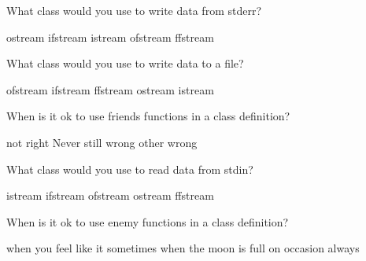 \documentclass[10pt,answers,addpoints]{exam}
\begin{document}
\begin{questions}
\par\vspace{0.100000in}\begin{minipage}{\linewidth}
\question[2]
What class would you use to write data from stderr?
\medskip
\begin{choices}
\choice ostream
\choice ifstream
\choice istream
\choice ofstream
\choice ffstream
\end{choices}
\setlength\answerlinelength{1in}
\answerline[A]

\end{minipage}


\par\vspace{0.100000in}\begin{minipage}{\linewidth}
\question[2]
What class would you use to write data to a file?
\medskip
\begin{choices}
\choice ofstream
\choice ifstream
\choice ffstream
\choice ostream
\choice istream
\end{choices}
\setlength\answerlinelength{1in}
\answerline[A]

\end{minipage}


\par\vspace{0.100000in}\begin{minipage}{\linewidth}
\question[2]
When is it ok to use friends functions in a class definition?
\medskip
\begin{choices}
\choice not right
\choice Never
\choice still wrong
\choice other
\choice wrong
\end{choices}
\setlength\answerlinelength{1in}
\answerline[B]

\end{minipage}


\par\vspace{0.100000in}\begin{minipage}{\linewidth}
\question[2]
What class would you use to read data from stdin?
\medskip
\begin{choices}
\choice istream
\choice ifstream
\choice ofstream
\choice ostream
\choice ffstream
\end{choices}
\setlength\answerlinelength{1in}
\answerline[A]

\end{minipage}


\par\vspace{0.100000in}\begin{minipage}{\linewidth}
\question[2]
When is it ok to use enemy functions in a class definition?
\medskip
\begin{choices}
\choice when you feel like it
\choice sometimes
\choice when the moon is full
\choice on occasion
\choice always
\end{choices}
\setlength\answerlinelength{1in}
\answerline[E]


\end{minipage}
\end{questions}
\end{document}
